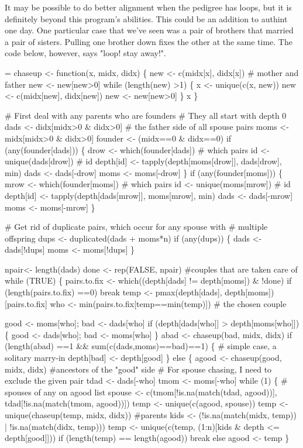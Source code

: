 \documentclass{article}
\begin{document}
It may be possible to do better alignment when the pedigree has loops,
but it is definitely beyond this program's abilities.  This could be
an addition to authint one day.
One particular case that we've seen was a pair of brothers that married
a pair of sisters.  Pulling one brother down fixes the other at the
same time.
The code below, however, says "loop! stay away!".
\begin{nwchunk}
=
 chaseup <- function(x, midx, didx) \{
     new <- c(midx[x], didx[x])  # mother and father
     new <- new[new>0]
     while (length(new) >1) \{
         x <- unique(c(x, new))
         new <- c(midx[new], didx[new])
         new <- new[new>0]
     \}
     x
 \}
             
 # First deal with any parents who are founders
 #  They all start with depth 0
 dads <- didx[midx>0 & didx>0]   # the father side of all spouse pairs
 moms <- midx[midx>0 & didx>0]
 founder <- (midx==0 & didx==0)
 if (any(founder[dads])) \{
     drow <- which(founder[dads])  # which pairs
     id  <- unique(dads[drow])     # id
     depth[id] <- tapply(depth[moms[drow]], dads[drow], min)
     dads <- dads[-drow]
     moms <- moms[-drow]
 \}
 if (any(founder[moms])) \{
     mrow <- which(founder[moms])  # which pairs
     id  <- unique(moms[mrow])     # id
     depth[id] <- tapply(depth[dads[mrow]], moms[mrow], min)
     dads <- dads[-mrow]
     moms <- moms[-mrow]
 \}
 
 # Get rid of duplicate pairs, which occur for any spouse with
 #  multiple offspring
 dups <- duplicated(dads + moms*n)
 if (any(dups)) \{
   dads <- dads[!dups]
   moms <- moms[!dups]
 \}
 
 npair<- length(dads)
 done <- rep(FALSE, npair)  #couples that are taken care of
 while (TRUE) \{
   pairs.to.fix <- which((depth[dads] != depth[moms]) & !done)
   if (length(pairs.to.fix) ==0) break
   temp <- pmax(depth[dads], depth[moms])[pairs.to.fix]
   who <- min(pairs.to.fix[temp==min(temp)])  # the chosen couple
   
   good <- moms[who]; bad <- dads[who]
   if (depth[dads[who]] > depth[moms[who]]) \{
     good <- dads[who]; bad <- moms[who]
   \}
   abad  <- chaseup(bad,  midx, didx)
   if (length(abad) ==1 && sum(c(dads,moms)==bad)==1) \{
     # simple case, a solitary marry-in
     depth[bad] <- depth[good]
   \}
   else \{
     agood <- chaseup(good, midx, didx)  #ancestors of the "good" side
     # For spouse chasing, I need to exclude the given pair
     tdad <- dads[-who]
     tmom <- moms[-who]
     while (1) \{
       # spouses of any on agood list
       spouse <- c(tmom[!is.na(match(tdad, agood))],
       tdad[!is.na(match(tmom, agood))])
       temp <- unique(c(agood, spouse))
       temp <- unique(chaseup(temp, midx, didx)) #parents
       kids <- (!is.na(match(midx, temp)) | !is.na(match(didx, temp)))
       temp <- unique(c(temp, (1:n)[kids & depth <= depth[good]]))
       if (length(temp) == length(agood)) break
       else agood <- temp
     \}
 

\end{nwchunk}
\end{document}

